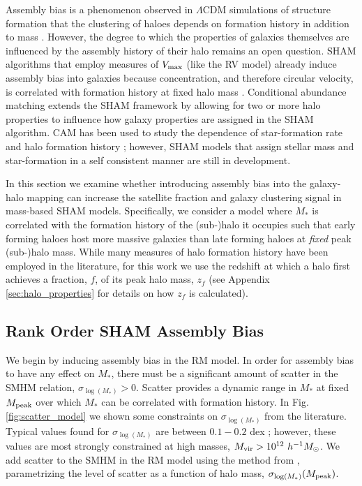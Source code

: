 \documentclass[a4paper,fleqn,usenatbib]{mnras}
\begin{document}
Assembly bias is a phenomenon observed in $\Lambda$CDM simulations of structure formation that the clustering of haloes depends on formation history in addition to mass \citep{Gao:2005ds, Wechsler:2006rg, Gao:2007yy, li:2008oi, Sunayama:2015ue}.  However, the degree to which the properties of galaxies themselves are influenced by the assembly history of their halo remains an open question.  SHAM algorithms that employ measures of $V_{\rm max}$ (like the RV model) already induce assembly bias into galaxies because concentration, and therefore circular velocity, is correlated with formation history at fixed halo mass \citep{Zentner:2014ki}.  Conditional abundance matching \citep[CAM,][]{Hearin:2014hh} extends the SHAM framework by allowing for two or more halo properties to influence how galaxy properties are assigned in the SHAM algorithm.  CAM has been used to study the dependence of star-formation rate and halo formation history \citep{Hearin:2013km, Hearin:2014hh, Watson:2015gq, Saito:2015vi, Paranjape:2015uy}; however, SHAM models that assign stellar mass and star-formation in a self consistent manner are still in development.

In this section we examine whether introducing assembly bias into the galaxy-halo mapping can increase the satellite fraction and galaxy clustering signal in mass-based SHAM models.  Specifically, we consider a model where $M_{*}$ is correlated with the formation history of the (sub-)halo it occupies such that early forming haloes host more massive galaxies than late forming haloes at {\em fixed} peak (sub-)halo mass.  While many measures of halo formation history have been employed in the literature, for this work we use the redshift at which a halo first achieves a fraction, $f$, of its peak halo mass, $z_{f}$ (see Appendix \ref{sec:halo_properties} for details on how $z_{f}$ is calculated).


\subsection{Rank Order SHAM Assembly Bias}

We begin by inducing assembly bias in the RM model.  In order for assembly bias to have any effect on $M_*$, there must be a significant amount of scatter in the SMHM relation, $\sigma_{\log(M_*)} >0$.  Scatter provides a dynamic range in $M_*$ at fixed $M_{\rm peak}$ over which $M_*$ can be correlated with formation history.  In Fig. \ref{fig:scatter_model} we shown some constraints on $\sigma_{\log(M_*)}$  from the literature.   Typical values found for $\sigma_{\log(M_*)}$ are between $0.1-0.2$ dex \citep{More:2011il, Reddick:2013gi, Zu:2015vh, Tinker:2016vu}; however, these values are most strongly constrained at high masses, $M_{\rm vir}>10^{12}~h^{-1}M_{\odot}$.  We add scatter to the SMHM in the RM model using the method from \citet{Behroozi:2010ja}, parametrizing the level of scatter as a function of halo mass, $\sigma_{\log(M_*)}(M_{\rm peak})$.   
\end{document}
